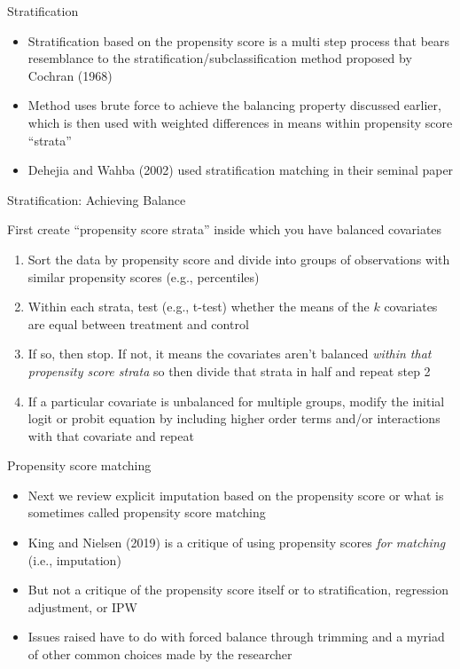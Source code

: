 \documentclass{beamer}
\begin{document}
\begin{frame}{Stratification}
	
	\begin{itemize}
	\item Stratification based on the propensity score is a multi step process that bears resemblance to the stratification/subclassification method proposed by Cochran (1968)
	\item  Method uses brute force to achieve the balancing property discussed earlier, which is then used with weighted differences in means within propensity score ``strata''
	\item Dehejia and Wahba (2002) used stratification matching in their seminal paper 
	\end{itemize}
	
\end{frame}


\begin{frame}{Stratification: Achieving Balance}
	
First create ``propensity score strata'' inside which you have balanced covariates
	\begin{enumerate}
		\item Sort the data by propensity score and divide into groups of observations with similar propensity scores (e.g., percentiles)
		\item Within each strata, test (e.g., t-test) whether the means of the $k$ covariates are equal between treatment and control
		\item If so, then stop.  If not, it means the covariates aren't balanced \emph{within that propensity score strata} so then divide that strata in half and repeat step 2
		\item If a particular covariate is unbalanced for multiple groups, modify the initial logit or probit equation by including higher order terms and/or interactions with that covariate and repeat
		\end{enumerate}

\end{frame}

\begin{frame}{Propensity score matching}
	
	\begin{itemize}
	\item Next we review explicit imputation based on the propensity score or what is sometimes called propensity score matching
	\item King and Nielsen (2019) is a critique of using propensity scores \emph{for matching} (i.e., imputation)
	\item But not a critique of the propensity score itself or to stratification, regression adjustment, or IPW
	\item Issues raised have to do with forced balance through trimming and a myriad of other common choices made by the researcher
	\end{itemize}
	
\end{frame}
\end{document}
